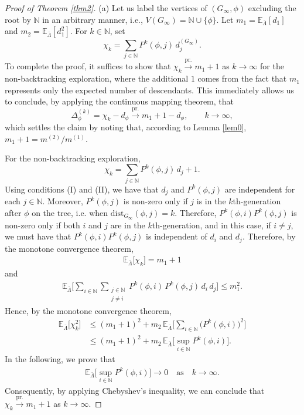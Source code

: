 \documentclass[11pt]{article}
\numberwithin{equation}{section}
\theoremstyle{plain}
\newcommand{\N}{\mathbb N}
\newcommand{\prob}{\overset{\mathrm{pr.}}{\longrightarrow}}
\newcommand{\E}{\mathbb E}
\begin{document}
\begin{proof}[Proof of Theorem \ref{thm2}]
(a) Let us label the vertices of $(G_{\infty}, \phi)$ excluding the root by $\mathbb{N}$ in an arbitrary manner, i.e., $V(G_\infty) = \mathbb{N} \cup \{\phi\}$. Let $m_{1}=\E_{\bar{\Lambda}}[d_{1}]$ and $m_{2}=\E_{\bar{\Lambda}}[d_{1}^{2}]$. For $k\in\N$, set 
\[
\chi_{k}=\sum_{j\in \N} P^{k}(\phi, j)\, d^{(G_\infty)}_{j}.
\]
To complete the proof, it suffices to show that $\chi_{k}\prob m_1+1$ as $k\to\infty$ for the non-backtracking exploration, where the additional $1$ comes from the fact that $m_1$ represents only the expected number of descendants. This immediately allows us to conclude, by applying the continuous mapping theorem, that
\[ 
\Delta_{\phi}^{(k)}=\chi_{k}-d_{\phi}\prob m_1 +1-d_{\phi},\quad\quad k\to\infty,
\]
which settles the claim by noting that, according to Lemma \ref{lem0}, $m_{1}+1=m^{(2)}/m^{(1)}$.

For the non-backtracking exploration, 
\[
\chi_{k}=\sum_{j\in \N} P^{k}(\phi, j)\, d_{j}+1.
\]
 Using conditions (I) and (II), we have that $d_j$ and $P^k(\phi, j)$ are independent for each $j \in \N$. Moreover, $P^k(\phi, j)$ is non-zero only if $j$ is in the $k$th-generation after $\phi$ on the tree, i.e. when $\mathrm{dist}_{G_{\infty}}(\phi, j)=k$. Therefore, $P^k(\phi, i)P^k(\phi, j)$ is non-zero only if both $i$ and $j$ are in the $k$th-generation, and in this case, if $i \neq j$, we must have that $P^k(\phi, i)P^k(\phi, j)$ is independent of $d_i$ and $d_j$.
Therefore, by the monotone convergence theorem,
\begin{align}\label{nk0}
\E_{\bar{\Lambda}}\big[\chi_{k}\big]=m_1+1
\end{align}
and
\begin{align*}
\E_{\bar{\Lambda}}\bigg[\sum_{i\in\N}\sum_{\substack{j \in \N \\ j \neq i}}P^{k}(\phi, i)\,P^{k}(\phi, j)\,d_{i}\, d_{j}\bigg]\leq m_{1}^{2}.
\end{align*}
Hence, by the monotone convergence theorem,
\begin{align*}
\E_{\bar{\Lambda}}\big[\chi_{k}^{2}\big]&\leq (m_{1}+1)^{2}+m_{2}\,\E_{\bar{\Lambda}}\bigg[\sum_{i\in\N}\big(P^{k}(\phi, i)\big)^2\bigg]\\&
\leq (m_{1}+1)^{2}+m_{2}\,\E_{\bar{\Lambda}}\bigg[\sup_{i\in\N}P^{k}(\phi, i)\bigg].
\end{align*}
In the following, we prove that 
\begin{align}\label{Esup}
\E_{\bar{\Lambda}}\bigg[\sup_{i\in\N}P^{k}(\phi, i)\bigg]
\to 0\quad \text{as}\quad k\to\infty.
\end{align}
Consequently, by applying Chebyshev's inequality, we can conclude that $\chi_{k}\prob m_1+1$ as $k\to\infty$. 


\end{proof}
\end{document}
